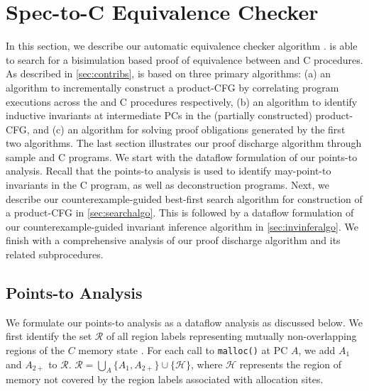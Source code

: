 \section{Spec-to-C Equivalence Checker}
\label{sec:spectocalgo}
In this section, we describe our automatic equivalence checker algorithm \toolName{}.
\toolName{} is able to search for a bisimulation based proof of equivalence
between \SpecL{} and C procedures.
As described in \cref{sec:contribs}, \toolName{} is based on three primary algorithms:
(a) an algorithm to incrementally construct a product-CFG by correlating program executions across
the \SpecL{} and C procedures respectively,
(b) an algorithm to identify inductive invariants at intermediate PCs in the (partially constructed)
product-CFG, and (c) an algorithm for solving proof obligations generated by the first two algorithms.
The last section illustrates our proof discharge algorithm through sample \SpecL{} and C programs.
We start with the dataflow formulation of our points-to analysis.
Recall that the points-to analysis is used to identify may-point-to invariants in the C program,
as well as deconstruction programs.
Next, we describe our counterexample-guided best-first search algorithm for
construction of a product-CFG in \cref{sec:searchalgo}.
This is followed by a dataflow formulation of our counterexample-guided invariant inference algorithm in \cref{sec:invinferalgo}.
We finish with a comprehensive analysis of our proof discharge algorithm and its related subprocedures.

\subsection{Points-to Analysis}
\label{sec:pointsToFormal}
We formulate our points-to analysis as a dataflow analysis as discussed below.
We first identify the set $\mathcal{R}$ of all region labels representing mutually non-overlapping
regions of the $C$ memory state \mem{}.
For each call to {\tt malloc()} at PC $A$, we add $A_1$ and $A_{2+}$ to $\mathcal{R}$. $\mathcal{R} = \bigcup_{A} \{ A_1, A_{2+} \} \cup \{ \mathcal{H} \}$,
where $\mathcal{H}$ represents the region of memory \mem{} not covered by the region labels associated with allocation sites.

